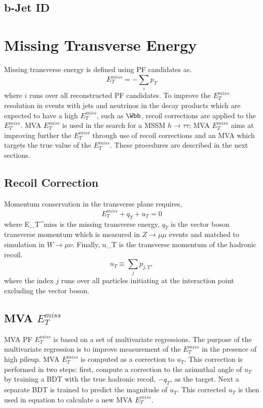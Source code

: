 
\subsection{b-Jet ID}
\section{Missing Transverse Energy}
Missing transverse energy is defined using PF candidates as.
\begin{equation}%
E_{T}^{miss} = -\sum_{i} p_{T}
\end{equation}
where $i$ runs over all reconstructed PF candidates. 
To improve the $E_{T}^{miss}$ resolution in 
events with jets and neutrinos in the decay products 
which are expected to have a high $E_{T}^{miss}$, such as $\Wbb$,
recoil corrections are applied to the $E_{T}^{miss}$. MVA 
$E_{T}^{miss}$ is used in the search for a MSSM $h\rightarrow\tau\tau$;
MVA $E_{T}^{miss}$ aims at improving further the $E_{T}^{miss}$
through use of recoil corrections and an MVA which targets the true value of the $E_{T}^{miss}$.
These procedures are described in the next sections.
\subsection{Recoil Correction}
Momentum conservation in the transverse plane requires,
\begin{equation}
E_{T}^{miss}+q_{T}+u_{T}=0
\end{equation}
where E_{T}^{miss} is the missing transverse energy,
$q_{T}$ is the vector boson transverse momentum which is measured
in $Z\rightarrow\mu\mu$ events and matched to simulation in $W\rightarrow\mu\nu$.
Finally, u_{T} is the transverse momentum of the hadronic recoil.
\begin{equation}
u_{T}\equiv\sum_{j} p_{j,T},
\end{equation}
where the index $j$ runs over all particles initiating at the interaction point excluding
the vector boson. 

\subsection{MVA $E_{T}^{miss}$}
MVA PF $E_{T}^{miss}$ is based on a set of multivariate regressions.
The purpose of the multivariate regression is to improve measurement of the $E_{T}^{miss}$
in the presence of high pileup.
MVA $E_{T}^{miss}$ is computed as a correction to $u_{T}$. This correction
is performed in two steps: %
first, compute a correction to the azimuthal angle
of $u_{T}$ by training a BDT with the true hadronic recoil, $-q_{T}$, as the target. Next
 a separate BDT is trained to predict the magnitude of $u_{T}$. This corrected
 $u_{T}$ is then used in equation %
 to calculate a new MVA $E_{T}^{miss}$. %
